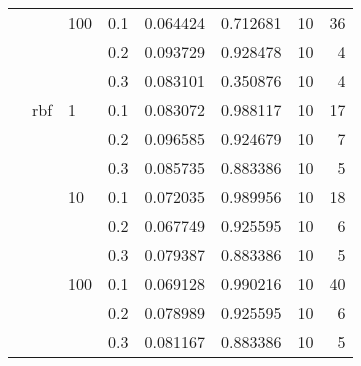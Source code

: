 \begin{table}[H]
\begin{tabular}{llllrrrr}
       &     & 100 & 0.1 &     0.064424 &  0.712681 &        10 &    36 \\
       &     &     & 0.2 &     0.093729 &  0.928478 &        10 &     4 \\
       &     &     & 0.3 &     0.083101 &  0.350876 &        10 &     4 \\
       & rbf & 1   & 0.1 &     0.083072 &  0.988117 &        10 &    17 \\
       &     &     & 0.2 &     0.096585 &  0.924679 &        10 &     7 \\
       &     &     & 0.3 &     0.085735 &  0.883386 &        10 &     5 \\
       &     & 10  & 0.1 &     0.072035 &  0.989956 &        10 &    18 \\
       &     &     & 0.2 &     0.067749 &  0.925595 &        10 &     6 \\
       &     &     & 0.3 &     0.079387 &  0.883386 &        10 &     5 \\
       &     & 100 & 0.1 &     0.069128 &  0.990216 &        10 &    40 \\
       &     &     & 0.2 &     0.078989 &  0.925595 &        10 &     6 \\
       &     &     & 0.3 &     0.081167 &  0.883386 &        10 &     5 \\
\bottomrule
\end{tabular}
\end{table}
